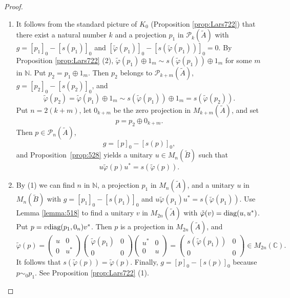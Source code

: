\documentclass{book}
\def\diag{\textnormal{diag}}
\begin{document}
\begin{proof}
  \begin{enumerate}
    \item It follows from the standard picture of \(K_0\) (Proposition \ref{prop:Lars722}) that
      there exist a natural number \(k\) and a projection \(p_1\) in \(\mathcal{P}_k(\tilde{A})\) with
      \(g={[p_1]}_0-{[s(p_1)]}_0\) and \({[\tilde{\varphi}(p_1)]}_0-{[s(\tilde{\varphi}(p_1))]}_0=0\).
      By Proposition \ref{prop:Lars722} (2), \(\tilde{\varphi}(p_1)\oplus1_m\sim s(\tilde{\varphi}(p_1))\oplus1_m\)
      for some \(m\) in \(\mathbb{N}\). Put \(p_2=p_1\oplus 1_m\). Then \(p_2\) belongs to \(\mathcal{P}_{k+m}(\tilde{A})\),
      \(g={[p_2]}_0-{[s(p_2)]}_0\), and
      \[
        \tilde{\varphi}(p_2)=\tilde{\varphi}(p_1)\oplus1_m\sim s(\tilde{\varphi}(p_1))\oplus1_m=s(\tilde{\varphi}(p_2)).
      \]
      Put \(n=2(k+m)\), let \(0_{k+m}\) be the zero projection in
      \(M_{k+m}(\tilde A)\), and set
      \[
        p=p_2\oplus0_{k+m}.
      \]
      Then \(p\in\mathcal P_n(\tilde A)\),
      \[
        g=[p]_0-[s(p)]_0,
      \]
      and Proposition~\ref{prop:528} yields a unitary
      \(u\in M_n(\tilde B)\) such that
      \[
        u\tilde\varphi(p)u^*=s(\tilde\varphi(p)).
      \]
    \item By (1) we can find \(n\) in \(\mathbb{N}\), a projection \(p_1\) in \(M_n(\tilde{A})\), and a unitary \(u\) in \(M_n(\tilde{B})\)
      with \(g={[p_1]}_0-{[s(p_1)]}_0\) and \(u\tilde{\varphi}(p_1)u^*=s(\tilde{\varphi}(p_1))\). Use Lemma \ref{lemma:518}
      to find a unitary \(v\) in \(M_{2n}(\tilde{A})\) with \(\tilde{\varphi}(v)=\diag(u,u^*)\). Put
      \(p=v\diag(p_1,0_n)v^*\). Then \(p\) is a projection in \(M_{2n}(\tilde{A})\), and
      \[
        \tilde{\varphi}(p)=\begin{pmatrix}
          u&0\\0&u^*
        \end{pmatrix}
        \begin{pmatrix}
          \tilde{\varphi}(p_1)&0\\0&0
        \end{pmatrix}
        \begin{pmatrix}
          u^*&0\\0&u
        \end{pmatrix}
        =\begin{pmatrix}
          s(\tilde{\varphi}(p_1))&0\\
          0&0
        \end{pmatrix}\in M_{2n}(\mathbb{C}).
      \]
      It follows that \(s(\tilde{\varphi}(p))=\tilde{\varphi}(p)\). Finally, \(g={[p]}_0-{[s(p)]}_0\)
      because \(p\sim_0 p_1\). See Proposition \ref{prop:Lars722} (1).
  \end{enumerate}
\end{proof}
\end{document}
